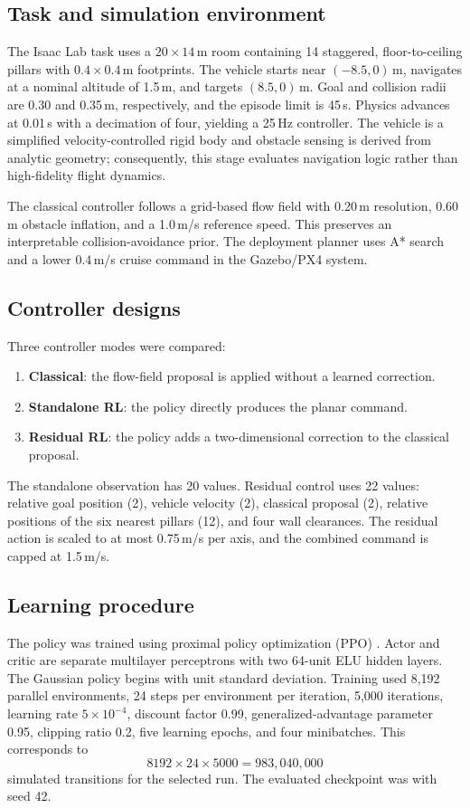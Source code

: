 \documentclass[10pt,twocolumn]{article}
\begin{document}
\subsection{Task and simulation environment}
The Isaac Lab task uses a $20\times14$\,m room containing 14 staggered, floor-to-ceiling pillars with $0.4\times0.4$\,m footprints. The vehicle starts near $(-8.5,0)$\,m, navigates at a nominal altitude of 1.5\,m, and targets $(8.5,0)$\,m. Goal and collision radii are 0.30 and 0.35\,m, respectively, and the episode limit is 45\,s. Physics advances at 0.01\,s with a decimation of four, yielding a 25\,Hz controller. The vehicle is a simplified velocity-controlled rigid body and obstacle sensing is derived from analytic geometry; consequently, this stage evaluates navigation logic rather than high-fidelity flight dynamics.

The classical controller follows a grid-based flow field with 0.20\,m resolution, 0.60\,m obstacle inflation, and a 1.0\,m/s reference speed. This preserves an interpretable collision-avoidance prior. The deployment planner uses A* search \cite{hart1968} and a lower 0.4\,m/s cruise command in the Gazebo/PX4 system.

\subsection{Controller designs}
Three controller modes were compared:
\begin{enumerate}
    \item \textbf{Classical}: the flow-field proposal is applied without a learned correction.
    \item \textbf{Standalone RL}: the policy directly produces the planar command.
    \item \textbf{Residual RL}: the policy adds a two-dimensional correction to the classical proposal.
\end{enumerate}

The standalone observation has 20 values. Residual control uses 22 values: relative goal position (2), vehicle velocity (2), classical proposal (2), relative positions of the six nearest pillars (12), and four wall clearances. The residual action is scaled to at most 0.75\,m/s per axis, and the combined command is capped at 1.5\,m/s.

\subsection{Learning procedure}
The policy was trained using proximal policy optimization (PPO) \cite{schulman2017}. Actor and critic are separate multilayer perceptrons with two 64-unit ELU hidden layers. The Gaussian policy begins with unit standard deviation. Training used 8,192 parallel environments, 24 steps per environment per iteration, 5,000 iterations, learning rate $5\times10^{-4}$, discount factor 0.99, generalized-advantage parameter 0.95, clipping ratio 0.2, five learning epochs, and four minibatches. This corresponds to
\[
8192\times24\times5000=983{,}040{,}000
\]
simulated transitions for the selected run. The evaluated checkpoint was  with seed 42.
\end{document}
